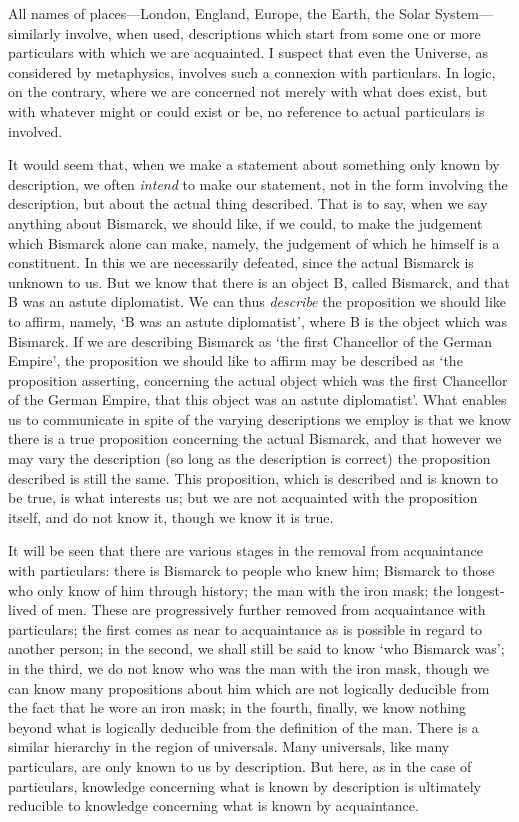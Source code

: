 \documentclass[oneside,letterpaper,12pt]{book}
\begin{document}
All names of places---London, England, Europe, the Earth, the Solar
System---similarly involve, when used, descriptions which start from
some one or more particulars with which we are acquainted. I suspect
that even the Universe, as considered by metaphysics, involves such a
connexion with particulars. In logic, on the contrary, where we are
concerned not merely with what does exist, but with whatever might or
could exist or be, no reference to actual particulars is involved.

It would seem that, when we make a statement about something only known
by description, we often \emph{intend} to make our statement, not in the
form involving the description, but about the actual thing described.
That is to say, when we say anything about Bismarck, we should like, if
we could, to make the judgement which Bismarck alone can make, namely,
the judgement of which he himself is a constituent. In this we are
necessarily defeated, since the actual Bismarck is unknown to us. But we
know that there is an object B, called Bismarck, and that B was an
astute diplomatist. We can thus \emph{describe} the proposition we
should like to affirm, namely, `B was an astute
diplomatist', where B is the object which was Bismarck.
If we are describing Bismarck as `the first Chancellor
of the German Empire', the proposition we should like to
affirm may be described as `the proposition asserting,
concerning the actual object which was the first Chancellor of the
German Empire, that this object was an astute
diplomatist'. What enables us to communicate in spite of
the varying descriptions we employ is that we know there is a true
proposition concerning the actual Bismarck, and that however we may vary
the description (so long as the description is correct) the proposition
described is still the same. This proposition, which is described and is
known to be true, is what interests us; but we are not acquainted with
the proposition itself, and do not know it, though we know it is true.

It will be seen that there are various stages in the removal from
acquaintance with particulars: there is Bismarck to people who knew him;
Bismarck to those who only know of him through history; the man with the
iron mask; the longest-lived of men. These are progressively further
removed from acquaintance with particulars; the first comes as near to
acquaintance as is possible in regard to another person; in the second,
we shall still be said to know `who Bismarck
was'; in the third, we do not know who was the man with
the iron mask, though we can know many propositions about him which are
not logically deducible from the fact that he wore an iron mask; in the
fourth, finally, we know nothing beyond what is logically deducible from
the definition of the man. There is a similar hierarchy in the region of
universals. Many universals, like many particulars, are only known to us
by description. But here, as in the case of particulars, knowledge
concerning what is known by description is ultimately reducible to
knowledge concerning what is known by acquaintance.
\end{document}
